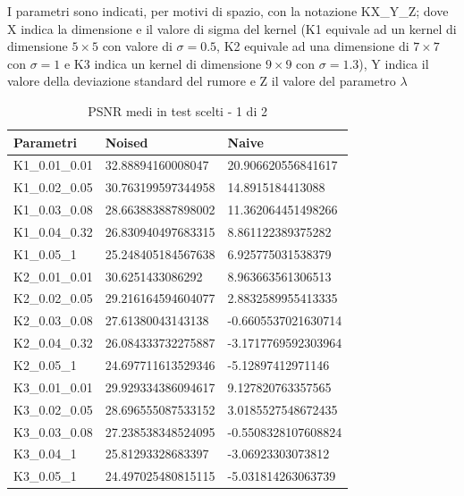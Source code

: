 \documentclass[12pt]{article}
\begin{document}
    I parametri sono indicati, per motivi di spazio, con la notazione KX\_Y\_Z; dove X indica la dimensione e il valore di sigma del kernel (K1 equivale ad un kernel di dimensione $5\times5$ con valore di $\sigma=0.5$, K2 equivale ad una dimensione di $7\times7$ con $\sigma=1$ e K3 indica un kernel di dimensione $9\times9$ con $\sigma=1.3$), Y indica il valore della deviazione standard del rumore e Z il valore del parametro $\lambda$
    
    \begin{table}[!ht]
    \centering
    \begin{tabular}{|l|l|l|}
    \hline
        Parametri & Noised & Naive \\ \hline
        K1\_0.01\_0.01 & 32.88894160008047 & 20.906620556841617 \\ \hline
        K1\_0.02\_0.05 & 30.763199597344958 & 14.8915184413088 \\ \hline
        K1\_0.03\_0.08 & 28.663883887898002 & 11.362064451498266 \\ \hline
        K1\_0.04\_0.32 & 26.830940497683315 & 8.861122389375282 \\ \hline
        K1\_0.05\_1 & 25.248405184567638 & 6.925775031538379 \\ \hline
        K2\_0.01\_0.01 & 30.6251433086292 & 8.963663561306513 \\ \hline
        K2\_0.02\_0.05 & 29.216164594604077 & 2.8832589955413335 \\ \hline
        K2\_0.03\_0.08 & 27.61380043143138 & -0.6605537021630714 \\ \hline
        K2\_0.04\_0.32 & 26.084333732275887 & -3.1717769592303964 \\ \hline
        K2\_0.05\_1 & 24.697711613529346 & -5.12897412971146 \\ \hline
        K3\_0.01\_0.01 & 29.929334386094617 & 9.127820763357565 \\ \hline
        K3\_0.02\_0.05 & 28.696555087533152 & 3.0185527548672435 \\ \hline
        K3\_0.03\_0.08 & 27.238538348524095 & -0.5508328107608824 \\ \hline
        K3\_0.04\_1 & 25.81293328683397 & -3.06923303073812 \\ \hline
        K3\_0.05\_1 & 24.497025480815115 & -5.031814263063739 \\ \hline
    \end{tabular}
    \caption{PSNR medi in test scelti - 1 di 2}
    \label{table:2}
    \end{table}
    
\end{document}
